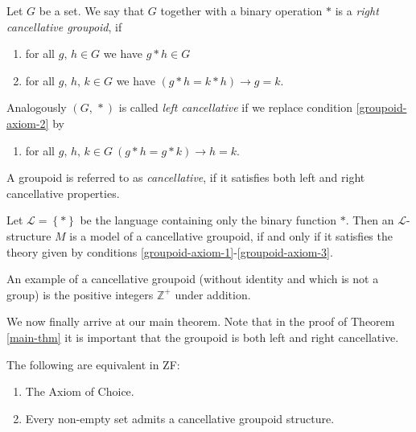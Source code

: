 \documentclass[../../main.tex]{subfiles}
\begin{document}
\begin{definition}[Groupoid]\label{groupoid-def}
    Let $G$ be a set.
    We say that $G$ together with a binary operation $*$ is a \emph{right cancellative groupoid}, if 
    \begin{enumerate}[label=(\roman*)]
        \item \label{groupoid-axiom-1} for all $g,\, h \in G$ we have $g * h \in G$
        \item \label{groupoid-axiom-2} for all $g,\, h,\, k \in G$ we have $\left(g * h = k * h\right) \rightarrow g = k$.
    \end{enumerate}
    Analogously $\left(G,\, *\right)$ is called \emph{left cancellative} if we replace condition \ref{groupoid-axiom-2} by
    \begin{enumerate}[label=(\roman*), resume]
        \item \label{groupoid-axiom-3} for all $g,\, h,\, k \in G \ \left(g * h = g * k\right) \rightarrow h = k$.
    \end{enumerate}
    A groupoid is referred to as \emph{cancellative}, if it satisfies both left and right cancellative properties.

    Let $\mathcal{L} = \left\{*\right\}$ be the language containing only the binary function $*$.
    Then an $\mathcal{L}$-structure $M$ is a model of a cancellative groupoid, 
    if and only if it satisfies the theory given by conditions \ref{groupoid-axiom-1}-\ref{groupoid-axiom-3}.
\end{definition}
An example of a cancellative groupoid (without identity and which is not a group) is the positive integers $\mathbb{Z}^+$ under addition.

We now finally arrive at our main theorem.
Note that in the proof of Theorem \ref{main-thm} it is important that the groupoid is both left and right cancellative.

\begin{theorem}\cite{Haj72}\label{main-thm}
    The following are equivalent in ZF:
    \begin{enumerate}
        \item The Axiom of Choice.
        \item Every non-empty set admits a cancellative groupoid structure.
    \end{enumerate}
\end{theorem}
\end{document}

